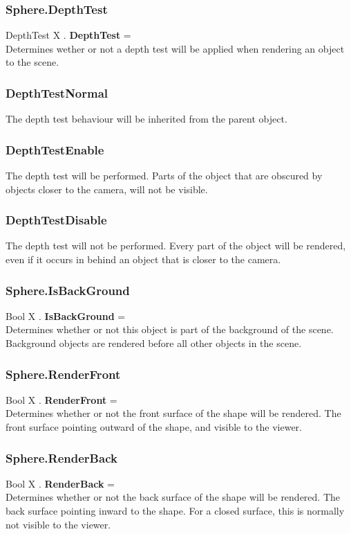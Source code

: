 \documentclass[10pt]{book}
\begin{document}
\subsubsection{Sphere.DepthTest \label{F:Sphere:DepthTest}}
DepthTest X . \textbf{DepthTest} = \\
Determines wether or not a depth test will be applied when rendering an object to the scene.

\subsubsection{DepthTestNormal \label{T:DepthTest|DepthTestNormal}}
The depth test behaviour will be inherited from the parent object.

\subsubsection{DepthTestEnable \label{T:DepthTest|DepthTestEnable}}
The depth test will be performed. Parts of the object that are obscured by objects closer to the camera, will not be visible.

\subsubsection{DepthTestDisable \label{T:DepthTest|DepthTestDisable}}
The depth test will not be performed. Every part of the object will be rendered, even if it occurs in behind an object that is closer to the camera.

\subsubsection{Sphere.IsBackGround \label{F:Sphere:IsBackGround}}
Bool X . \textbf{IsBackGround} = \\
Determines whether or not this object is part of the background of the scene. Background objects are rendered before all other objects in the scene.

\subsubsection{Sphere.RenderFront \label{F:Sphere:RenderFront}}
Bool X . \textbf{RenderFront} = \\
Determines whether or not the front surface of the shape will be rendered. The front surface pointing outward of the shape, and visible to the viewer.

\subsubsection{Sphere.RenderBack \label{F:Sphere:RenderBack}}
Bool X . \textbf{RenderBack} = \\
Determines whether or not the back surface of the shape will be rendered. The back surface pointing inward to the shape. For a closed surface, this is normally not visible to the viewer.
\end{document}

